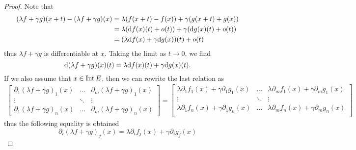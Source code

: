 \begin{proof}
  Note that
  \begin{align*}
    (\lambda f + \gamma g)(x + t) - (\lambda f + \gamma g)(x)
    &= \lambda (f(x + t) - f(x)) + \gamma (g(x + t) + g(x)) \\
    &= \lambda(\mathrm{d} f(x)(t) + o(t)) + \gamma(\mathrm{d} g(x)(t) + o(t)) \\
    &= (\lambda \mathrm{d} f(x) + \gamma \mathrm{d} g(x))(t) + o(t)
  \end{align*}
  thus \(\lambda f + \gamma g\) is differentiable at \(x\). Taking the limit as
  \(t \to 0\), we find
  \[
    \mathrm{d}(\lambda f + \gamma g)(x)(t)
    = \lambda \mathrm{d} f(x)(t) + \gamma \mathrm{d} g(x)(t).
  \]
  If we also assume that \(x \in \operatorname{Int} E\), then we can rewrite the last relation
  as
  {\small%
  \begin{align*}
    \begin{bmatrix}
      \partial_1 (\lambda f + \gamma g)_1(x) &\dots &\partial_m (\lambda f +
      \gamma g)_1(x) \\
      \vdots &\ddots &\vdots \\
      \partial_1 (\lambda f + \gamma g)_n(x) &\dots &\partial_m(\lambda f +
      \gamma g)_n(x)
    \end{bmatrix}
    =
    \begin{bmatrix}
      \lambda \partial_1 f_1(x) + \gamma \partial_1 g_1(x) &\dots &\lambda
      \partial_m f_1(x) + \gamma \partial_m g_1(x) \\
      \vdots &\ddots &\vdots \\
      \lambda \partial_1 f_n(x) + \gamma \partial_1 g_n(x) &\dots &\lambda
      \partial_m f_n(x) + \gamma \partial_m g_n(x) \\
    \end{bmatrix}
  \end{align*}
  }%
  thus the following equality is obtained
  \[
    \partial_i (\lambda f + \gamma g)_j(x) = \lambda \partial_i f_j(x) + \gamma
    \partial_i g_j(x)
  \]
\end{proof}

